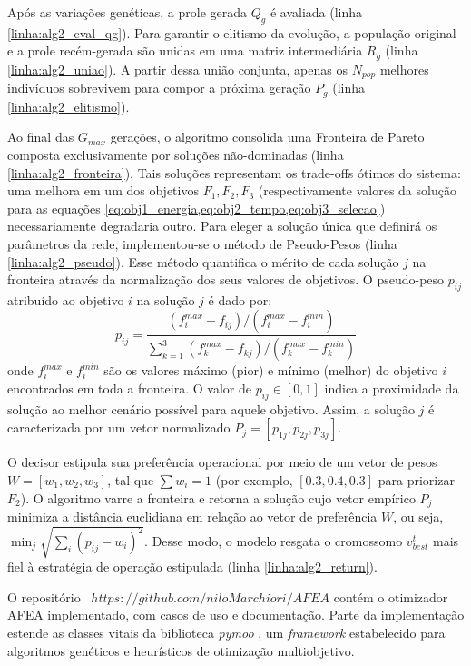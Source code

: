 Após as variações genéticas, a prole gerada $Q_g$ é avaliada (linha \ref{linha:alg2_eval_qg}). Para garantir o elitismo da evolução, a população original e a prole recém-gerada são unidas em uma matriz intermediária $R_g$ (linha \ref{linha:alg2_uniao}). A partir dessa união conjunta, apenas os $N_{pop}$ melhores indivíduos sobrevivem para compor a próxima geração $P_g$ (linha \ref{linha:alg2_elitismo}).

Ao final das $G_{max}$ gerações, o algoritmo consolida uma Fronteira de Pareto composta exclusivamente por soluções não-dominadas (linha \ref{linha:alg2_fronteira}). Tais soluções representam os trade-offs ótimos do sistema: uma melhora em um dos objetivos $F_1, F_2, F_3$ (respectivamente valores da solução para as equações \cref{eq:obj1_energia,eq:obj2_tempo,eq:obj3_selecao}) necessariamente degradaria outro. Para eleger a solução única que definirá os parâmetros da rede, implementou-se o método de Pseudo-Pesos (linha \ref{linha:alg2_pseudo}). Esse método quantifica o mérito de cada solução $j$ na fronteira através da normalização dos seus valores de objetivos. O pseudo-peso $p_{ij}$ atribuído ao objetivo $i$ na solução $j$ é dado por:
\begin{equation}
    p_{ij} = \frac{ (f_i^{max} - f_{ij}) / (f_i^{max} - f_i^{min}) }{ \sum_{k=1}^3 (f_k^{max} - f_{kj}) / (f_k^{max} - f_k^{min}) }
\end{equation}
onde $f_i^{max}$ e $f_i^{min}$ são os valores máximo (pior) e mínimo (melhor) do objetivo $i$ encontrados em toda a fronteira. O valor de $p_{ij} \in [0, 1]$ indica a proximidade da solução ao melhor cenário possível para aquele objetivo. Assim, a solução $j$ é caracterizada por um vetor normalizado $P_j = [p_{1j}, p_{2j}, p_{3j}]$. 

O decisor estipula sua preferência operacional por meio de um vetor de pesos $W = [w_1, w_2, w_3]$, tal que $\sum w_i = 1$ (por exemplo, $[0.3, 0.4, 0.3]$ para priorizar $F_2$). O algoritmo varre a fronteira e retorna a solução cujo vetor empírico $P_j$ minimiza a distância euclidiana em relação ao vetor de preferência $W$, ou seja, $\min_j \sqrt{\sum_i (p_{ij} - w_i)^2}$. Desse modo, o modelo resgata o cromossomo $v_{best}^t$ mais fiel à estratégia de operação estipulada (linha \ref{linha:alg2_return}).

O repositório ~\href{https://github.com/niloMarchiori/AFEA}{$https://github.com/niloMarchiori/AFEA$} contém o otimizador AFEA implementado, com casos de uso e documentação. Parte da implementação estende as classes vitais da biblioteca \textit{pymoo} \cite{pymoo}, um \textit{framework} estabelecido para algoritmos genéticos e heurísticos de otimização multiobjetivo.

